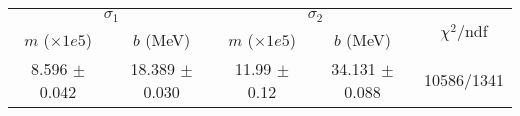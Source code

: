 \begin{tabular}{cc|cc||c}
\multicolumn{2}{c|}{$\sigma_1$} & \multicolumn{2}{|c}{$\sigma_2$} & \multirow{2}{*}{$\chi^2/$ndf} \\
$m$ ($\times1e5$) & $b$ (MeV) & $m$ ($\times1e5$) & $b$ (MeV) & \\
\hline
8.596 $\pm$ 0.042 & 18.389 $\pm$ 0.030 & 11.99 $\pm$ 0.12 & 34.131 $\pm$ 0.088 & 10586/1341\\
\end{tabular}

